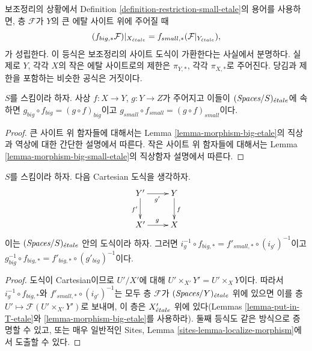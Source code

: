 \noindent
보조정리의 상황에서 Definition \ref{definition-restriction-small-etale}의
용어를 사용하면, 층 $\mathcal{F}$가 $Y$의 큰 에탈 사이트 위에 주어질 때
$$
(f_{big, *}\mathcal{F})|_{X_{\acute{e}tale}} =
f_{small, *}(\mathcal{F}|_{Y_{\acute{e}tale}}),
$$
가 성립한다. 이 등식은 보조정리의 사이트 도식이 가환한다는 사실에서
분명하다. 실제로 $Y$, 각각 $X$의 작은 에탈 사이트로의 제한은
$\pi_{Y, *}$, 각각 $\pi_{X, *}$로 주어진다. 당김과 제한을 포함하는
비슷한 공식은 거짓이다.

\begin{lemma}
\label{lemma-composition-etale}
$S$를 스킴이라 하자. 사상 $f : X \to Y$, $g : Y \to Z$가 주어지고
이들이 $(\textit{Spaces}/S)_{\acute{e}tale}$에 속하면
$g_{big} \circ f_{big} = (g \circ f)_{big}$이고
$g_{small} \circ f_{small} = (g \circ f)_{small}$이다.
\end{lemma}

\begin{proof}
큰 사이트 위 함자들에 대해서는 Lemma \ref{lemma-morphism-big-etale}의
직상과 역상에 대한 간단한 설명에서 따른다. 작은 사이트 위 함자들에
대해서는 Lemma \ref{lemma-morphism-big-small-etale}의 직상함자 설명에서
따른다.
\end{proof}

\begin{lemma}
\label{lemma-morphism-big-small-cartesian-diagram-etale}
$S$를 스킴이라 하자. 다음 Cartesian 도식을 생각하자.
$$
\xymatrix{
Y' \ar[r]_{g'} \ar[d]_{f'} & Y \ar[d]^f \\
X' \ar[r]^g & X
}
$$
이는 $(\textit{Spaces}/S)_{\acute{e}tale}$ 안의 도식이라 하자. 그러면
$i_g^{-1} \circ f_{big, *} = f'_{small, *} \circ (i_{g'})^{-1}$이고
$g_{big}^{-1} \circ f_{big, *} = f'_{big, *} \circ (g'_{big})^{-1}$이다.
\end{lemma}

\begin{proof}
도식이 Cartesian이므로 $U'/X'$에 대해
$U' \times_{X'} Y' = U' \times_X Y$이다. 따라서
$i_g^{-1} \circ f_{big, *}$와 $f'_{small, *} \circ (i_{g'})^{-1}$는 모두
층 $\mathcal{F}$가 $(\textit{Spaces}/Y)_{\acute{e}tale}$ 위에 있으면 이를 층
$U' \mapsto \mathcal{F}(U' \times_{X'} Y')$로 보내며, 이 층은
$X'_{\acute{e}tale}$ 위에 있다(Lemmas
\ref{lemma-put-in-T-etale}와 \ref{lemma-morphism-big-etale}를 사용하라).
둘째 등식도 같은 방식으로 증명할 수 있고, 또는 매우 일반적인 Sites,
Lemma \ref{sites-lemma-localize-morphism}에서 도출할 수 있다.
\end{proof}

